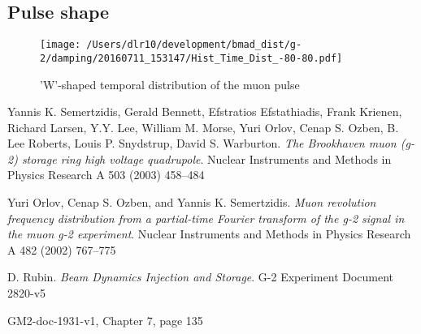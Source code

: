 \documentclass[10pt]{article}
\begin{document}
\subsection{Pulse shape}
\begin{figure}[htbp] %
\begin{minipage}[t]{0.48\textwidth}
   \centering
   \texttt{[image: /Users/dlr10/development/bmad\_dist/g-2/damping/20160711\_153147/Hist\_Time\_Dist\_-80-80.pdf]} 
   \caption{'W'-shaped temporal distribution of the muon pulse\label{fig:Wshape}}
 \end{minipage}
\end{figure}


\newpage
\begin{thebibliography}{9}

Yannis K. Semertzidis, Gerald Bennett, Efstratios Efstathiadis, Frank Krienen, Richard Larsen, Y.Y. Lee, William M. Morse, 
Yuri Orlov, Cenap S. Ozben, B. Lee Roberts, Louis P. Snydstrup, David S. Warburton.
\textit{The Brookhaven muon (g-2) storage ring high voltage quadrupole}.
Nuclear Instruments and Methods in Physics Research A 503 (2003) 458–484


Yuri Orlov, Cenap S. Ozben, and Yannis K. Semertzidis.
\textit{Muon revolution frequency distribution from a partial-time Fourier transform of the g-2 signal in the muon g-2 experiment}.
Nuclear Instruments and Methods in Physics Research A 482 (2002) 767–775

D. Rubin. \textit{Beam Dynamics Injection and Storage}. G-2 Experiment Document 2820-v5

 GM2-doc-1931-v1, Chapter 7, page 135
\end{thebibliography}
\end{document}
